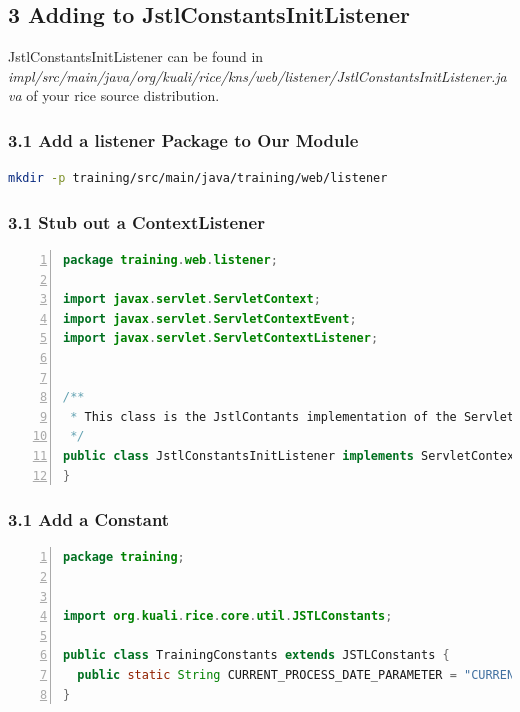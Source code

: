\subsection*{3 Adding to JstlConstantsInitListener}
JstlConstantsInitListener can be found in
\emph{impl/src/main/java/org/kuali/rice/kns/web/listener/JstlConstantsInitListener.java}
of your rice source distribution.

\subsubsection*{3.1 Add a listener Package to Our Module}

\begin{lstlisting}[basicstyle=\scriptsize,language=bash,backgroundcolor=\color{ubergray},caption={Directory creation for Linux
    users},frame=single,breaklines=true]
  mkdir -p training/src/main/java/training/web/listener
\end{lstlisting}

\subsubsection*{3.1 Stub out a ContextListener}
\begin{lstlisting}[basicstyle=\scriptsize,numbers=left,language=java,backgroundcolor=\color{ubergray},caption={training/web/TrainingFunctions},frame=single,breaklines=true]
package training.web.listener;

import javax.servlet.ServletContext;
import javax.servlet.ServletContextEvent;
import javax.servlet.ServletContextListener;


/**
 * This class is the JstlContants implementation of the ServletContextListener.
 */
public class JstlConstantsInitListener implements ServletContextListener {
}
\end{lstlisting}


\subsubsection*{3.1 Add a Constant}
\begin{lstlisting}[basicstyle=\scriptsize,numbers=left,language=java,backgroundcolor=\color{ubergray},caption={training/web/TrainingFunctions},frame=single,breaklines=true]
package training;


import org.kuali.rice.core.util.JSTLConstants;

public class TrainingConstants extends JSTLConstants {
  public static String CURRENT_PROCESS_DATE_PARAMETER = "CURRENT_PROCESS_DATE";
}
\end{lstlisting}

